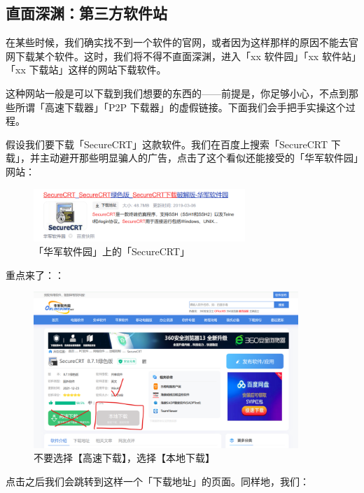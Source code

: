 \subsection{直面深渊：第三方软件站}

在某些时候，我们确实找不到一个软件的官网，或者因为这样那样的原因不能去官网下载某个软件。这时，我们将不得不直面深渊，进入「xx 软件园」「xx 软件站」「xx 下载站」这样的网站下载软件。

这种网站一般是可以下载到我们想要的东西的——前提是，你足够小心，不点到那些所谓「高速下载器」「P2P 下载器」的虚假链接。下面我们会手把手实操这个过程。

假设我们要下载「SecureCRT」这款软件。我们在百度上搜索「SecureCRT 下载」，并主动避开那些明显骗人的广告，点击了这个看似还能接受的「华军软件园」网站：

\begin{figure}[H]
  \centering
  \includegraphics[width=8cm]{assets/Huajun_1.png}
  \caption{「华军软件园」上的「SecureCRT」}
  \label{huajun-1}
\end{figure}

重点来了：：

\begin{figure}[H]
  \centering
  \includegraphics[width=10cm]{assets/Huajun_2.png}
  \caption{不要选择【高速下载】，选择【本地下载】}
  \label{huajun-2}
\end{figure}

点击之后我们会跳转到这样一个「下载地址」的页面。同样地，我们：

